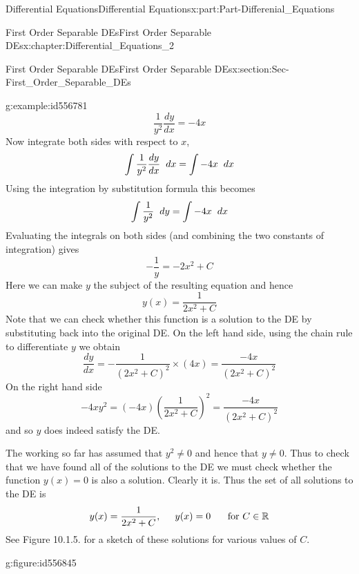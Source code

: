 \documentclass[oneside,10pt,]{book}
\numberwithin{equation}{section}
\begin{document}
\begin{partptx}{Differential Equations}{}{Differential Equations}{}{}{x:part:Part-Differenial_Equations}
\begin{chapterptx}{First Order Separable DEs}{}{First Order Separable DEs}{}{}{x:chapter:Differential_Equations_2}
\begin{sectionptx}{First Order Separable DEs}{}{First Order Separable DEs}{}{}{x:section:Sec-First_Order_Separable_DEs}
\begin{example}{}{g:example:id556781}
\begin{equation*}
\frac{1}{y^2}\frac{dy}{dx}=-4x
\end{equation*}
Now integrate both sides with respect to \(x\),%
\begin{equation*}
\int \frac{1}{y^2}\frac{dy}{dx}\hspace{2mm} dx=\int -4x\hspace{2mm} dx
\end{equation*}
Using the integration by substitution formula this becomes%
\begin{equation*}
\int \frac{1}{y^2}\hspace{2mm} dy=\int -4x\hspace{2mm} dx
\end{equation*}
Evaluating the integrals on both sides (and combining the two constants of integration) gives%
\begin{equation*}
-\frac{1}{y}=-2x^2+C
\end{equation*}
Here we can make \(y\) the subject of the resulting equation and hence%
\begin{equation*}
y(x)=\frac{1}{2x^2+C}
\end{equation*}
Note that we can check whether this function is a solution to the DE by substituting back into the original DE. On the left hand side, using the chain rule to differentiate \(y\) we obtain%
\begin{equation*}
\frac{dy}{dx}=-\frac{1}{(2x^2+C)^2}\times (4x)=\frac{-4x}{(2x^2+C)^2}
\end{equation*}
On the right hand side%
\begin{equation*}
-4xy^2=(-4x)\left(\frac{1}{2x^2+C}\right)^2=\frac{-4x}{(2x^2+C)^2}
\end{equation*}
and so \(y\) does indeed satisfy the DE.%
\par
The working so far has assumed that \(y^2\neq 0\) and hence that \(y\neq 0\). Thus to check that we have found all of the solutions to the DE we must check whether the function \(y(x)=0\) is also a solution. Clearly it is. Thus the set of all solutions to the DE is%
\begin{equation*}
y(x)=\frac{1}{2x^2+C}, \hspace{5mm} y(x)=0 \hspace{5mm} \textrm{ for } C\in\mathbb{R}
\end{equation*}
See Figure 10.1.5. for a sketch of these solutions for various values of \(C\). \begin{figureptx}{}{g:figure:id556845}{}%
\begin{image}{0.125}{0.75}{0.125}%

\end{image}
\end{figureptx}
\end{example}
\end{sectionptx}
\end{chapterptx}
\end{partptx}
\end{document}

